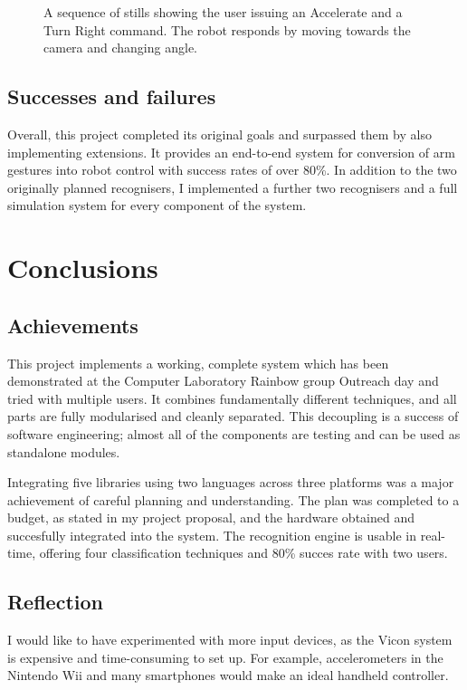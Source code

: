 \documentclass[12pt,a4,notitlepage]{report}
\renewcommand{\_}{\texttt{\symbol{95}}}
\newcommand{\<}{\texttt{\symbol{60}}}
\renewcommand{\>}{\texttt{\symbol{62}}}
\begin{document}
\begin{figure}
\caption{A sequence of stills showing the user issuing an Accelerate and a Turn Right command. The robot responds by moving towards the camera and changing angle.}
\label{driving}
\end{figure}
\section{Successes and failures}

Overall, this project completed its original goals and surpassed them by also implementing extensions. It provides an end-to-end system for conversion of arm gestures into robot control with success rates of over 80\%. In addition to the two originally planned recognisers, I implemented a further two recognisers and a full simulation system for every component of the system.

\chapter{Conclusions}

\section{Achievements}

This project implements a working, complete system which has been demonstrated at the Computer Laboratory Rainbow group Outreach day and tried with multiple users. It combines fundamentally different techniques, and all parts are fully modularised and cleanly separated. This decoupling is a success of software engineering; almost all of the components are testing and can be used as standalone modules.

Integrating five libraries using two languages across three platforms was a major achievement of careful planning and understanding. The plan was completed to a budget, as stated in my project proposal, and the hardware obtained and succesfully integrated into the system. The recognition engine is usable in real-time, offering four classification techniques and 80\% succes rate with two users.

\section{Reflection}

I would like to have experimented with more input devices, as the Vicon system is expensive and time-consuming to set up. For example, accelerometers in the Nintendo Wii and many smartphones would make an ideal handheld controller.
\end{document}
